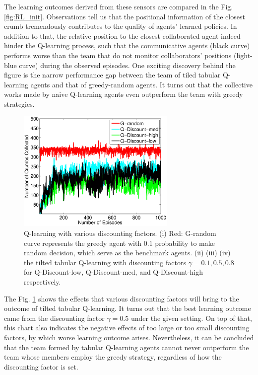 \documentclass[conference]{IEEEtran}
\begin{document}
The learning outcomes derived from these sensors are compared in the
Fig. \ref{fig:RL_init}. 
Observations tell us that the positional information of the closest crumb
tremendously contributes to the quality of agents' learned policies. 
In addition to that, the relative position to the closest collaborated agent
indeed hinder the Q-learning process, such that the communicative agents (black
curve) performs worse than the team that do not monitor collaborators'
positions (light-blue curve) during the observed episodes. One exciting
discovery behind the figure is the narrow performance gap between the team of
tiled tabular Q-learning agents and that of greedy-random agents. It turns out
that the collective works made by naive Q-learning agents even outperform the
team with greedy strategies.

\begin{figure}[!t]
\centering
\includegraphics[width=3.0in]{./figures/RL/init_setup2.eps}
\caption{Q-learning with various discounting factors. (i) Red: G-random curve
    represents the greedy agent with $0.1$ probability to make random
    decision, which serve as the benchmark agents. 
    (ii) (iii) (iv) the tilted tabular Q-learning with discounting factors
    $\gamma = 0.1, 0.5, 0.8$ for Q-Discount-low, Q-Discount-med, and
    Q-Discount-high respectively.}
\label{fig:RL_init2}
\end{figure}

The Fig. \ref{fig:RL_init2} shows the effects that various discounting factors
will bring to the outcome of tilted tabular Q-learning. It turns out that the
best learning outcome came from the discounting factor $\gamma = 0.5$ under
the given setting. On top of that, this chart also indicates the negative
effects of too large or too small discounting factors, by which worse learning
outcome arises. Nevertheless, it can be concluded that the team formed by
tabular Q-learning agents cannot never outperform the team whose members
employ the greedy strategy, regardless of how the discounting factor is set.
\end{document}
